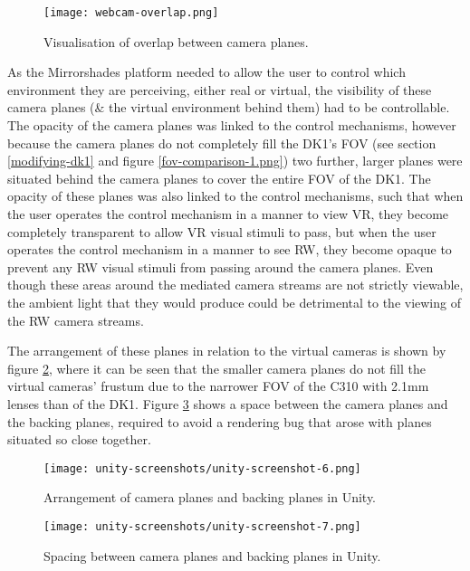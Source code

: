 \begin{figure}[h]
	\begin{center}
		\texttt{[image: webcam-overlap.png]}
		\caption{Visualisation of overlap between camera planes.}
		\label{webcam-overlap.png}
	\end{center}
\end{figure}

As the Mirrorshades platform needed to allow the user to control which environment they are perceiving, either real or virtual, the visibility of these camera planes (\& the virtual environment behind them) had to be controllable. The opacity of the camera planes was linked to the control mechanisms, however because the camera planes do not completely fill the DK1's FOV (see section \ref{modifying-dk1} and figure \ref{fov-comparison-1.png}) two further, larger planes were situated behind the camera planes to cover the entire FOV of the DK1. The opacity of these planes was also linked to the control mechanisms, such that when the user operates the control mechanism in a manner to view VR, they become completely transparent to allow VR visual stimuli to pass, but when the user operates the control mechanism in a manner to see RW, they become opaque to prevent any RW visual stimuli from passing around the camera planes. Even though these areas around the mediated camera streams are not strictly viewable, the ambient light that they would produce could be detrimental to the viewing of the RW camera streams.

The arrangement of these planes in relation to the virtual cameras is shown by figure \ref{unity-screenshot-6.png}, where it can be seen that the smaller camera planes do not fill the virtual cameras' frustum due to the narrower FOV of the C310 with 2.1mm lenses than of the DK1. Figure \ref{unity-screenshot-7.png} shows a space between the camera planes and the backing planes, required to avoid a rendering bug that arose with planes situated so close together.

\begin{figure}[h]
	\begin{center}
		\texttt{[image: unity-screenshots/unity-screenshot-6.png]}
		\caption{Arrangement of camera planes and backing planes in Unity.}
		\label{unity-screenshot-6.png}
	\end{center}
\end{figure}

\begin{figure}[h]
	\begin{center}
		\texttt{[image: unity-screenshots/unity-screenshot-7.png]}
		\caption{Spacing between camera planes and backing planes in Unity.}
		\label{unity-screenshot-7.png}
	\end{center}
\end{figure}

